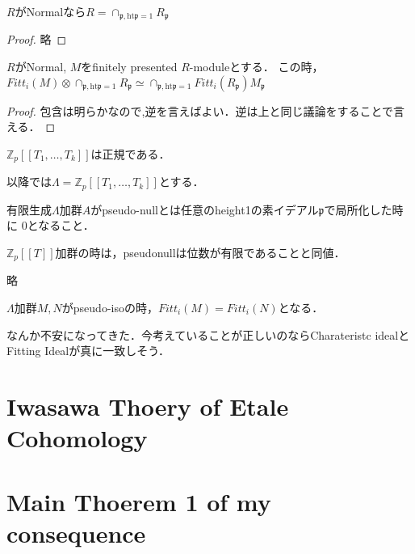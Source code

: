\documentclass{ujarticle}
\begin{document}
\begin{prop}
 $R$がNormalなら$R = \cap_{ \scriptscriptstyle  \mathfrak{p}, \mathrm{ht}\mathfrak{p}=1 }R_{\mathfrak{p}} $
\end{prop}
\begin{proof}
 略
\end{proof}

\begin{prop}
 $R$がNormal, $M$をfinitely presented $R$-moduleとする．
 この時，$Fitt_i(M) \otimes \cap_{\mathfrak{p},\mathrm{ht}\mathfrak{p}=1} R_{\mathfrak{p}} \simeq  \cap_{\mathfrak{p},\mathrm{ht}\mathfrak{p}=1} Fitt_i(R_{\mathfrak{p}})M_{\mathfrak{p}}$
\end{prop}
\begin{proof}
 包含は明らかなので,逆を言えばよい．逆は上と同じ議論をすることで言える．
\end{proof}

\begin{prop}
 $\mathbb{Z}_p[[T_1,\dots ,T_k]] $は正規である．
\end{prop}
以降では$\Lambda = \mathbb{Z}_p[[T_1,\dots ,T_k]] $とする．
\begin{dfn}
  有限生成$\Lambda$加群$A$がpseudo-nullとは任意のheight1の素イデアル$\mathfrak{p}$で局所化した時に
  $0$となること．
\end{dfn}

\begin{prop}
 $\mathbb{Z}_p[[T]]$加群の時は，pseudonullは位数が有限であることと同値．
\end{prop}

\begin{thm}
  略
\end{thm}

\begin{prop}
   $\Lambda$加群$M,N$がpseudo-isoの時，$Fitt_i(M)=Fitt_i(N)$となる．
\end{prop}
\begin{rem}
 なんか不安になってきた．今考えていることが正しいのならCharateristc idealとFitting Idealが真に一致しそう．

\end{rem}

\section{Iwasawa Thoery of Etale Cohomology}
\label{sec:Iwasawa Thoery of Etale Cohomology}

\section{Main Thoerem 1 of my consequence}
\label{sec:Main Thoerem 1 of my consequence}
\end{document}
